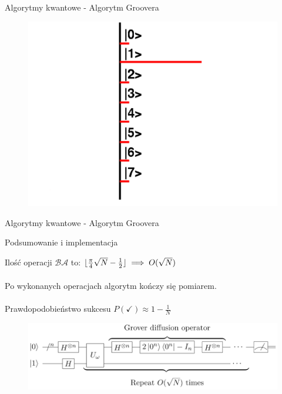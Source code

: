 \documentclass{beamer}
\DeclarePairedDelimiter\floor{\lfloor}{\rfloor}
\begin{document}
	
	\begin{frame}{Algorytmy kwantowe - Algorytm Groovera}
		\vspace{0.5em}
		\begin{center}
			\begin{figure}
				\includegraphics[scale=0.28]{media/visualization7.png}
			\end{figure}
		\end{center}
		\vspace{0.5em}
	\end{frame}	
		
	\begin{frame}{Algorytmy kwantowe - Algorytm Groovera}
		\vspace{0.5em}

	
		\begin{block}{Podsumowanie i implementacja}
			\vspace{0.5em}
			
			Ilość operacji $\mathcal{B}\mathcal{A}$ to: $\floor{\frac{\pi}{4}\sqrt{N} - \frac{1}{2}}\implies O(\sqrt{N})$ \\~\\
			Po wykonanych operacjach algorytm kończy się pomiarem.\\~\\
			Prawdopodobieństwo sukcesu $P(\checkmark) \approx 1 - \frac{1}{N} $
			\begin{center}
				\begin{figure}
					\includegraphics[scale=0.55]{media/groverCircuit.png}
				\end{figure}
			\end{center}
		\vspace{1em}	
		\end{block}
	\end{frame}
\end{document}

